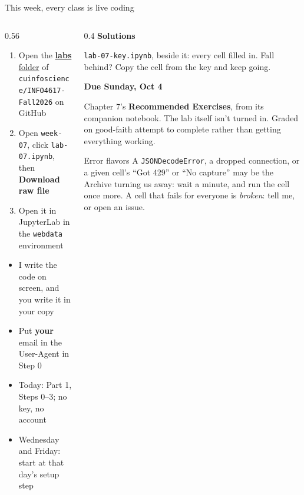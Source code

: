 \documentclass[9pt,aspectratio=169]{beamer}
\begin{document}
\begin{frame}{This week, every class is live coding}
    \begin{columns}[T]
        \begin{column}{0.56\textwidth}
            \begin{enumerate}\small
                \item Open the \href{https://github.com/cuinfoscience/INFO4617-Fall2026/tree/main/labs}{\textbf{labs} folder} of \texttt{cuinfoscience/INFO4617-Fall2026} on GitHub
                \item Open \texttt{week-07}, click \texttt{lab-07.ipynb}, then \textbf{Download raw file}
                \item Open it in JupyterLab in the \texttt{webdata} environment
            \end{enumerate}

            \medskip
            \begin{itemize}\small
                \item I write the code on screen, and you write it in your copy
                \item Put \textbf{your} email in the User-Agent in Step 0
                \item Today: Part 1, Steps 0--3; no key, no account
                \item Wednesday and Friday: start at that day's setup step
            \end{itemize}
        \end{column}
        \begin{column}{0.4\textwidth}
            \textbf{Solutions}\\[2pt]
            {\footnotesize \texttt{lab-07-key.ipynb}, beside it: every cell filled in. Fall behind? Copy the cell from the key and keep going.\par}
            \medskip
            \textbf{Due Sunday, Oct 4}\\[2pt]
            {\footnotesize Chapter 7's \textbf{Recommended Exercises}, from its companion notebook. The lab itself isn't turned in. Graded on good-faith attempt to complete rather than getting everything working.\par}
            \medskip
            \begin{alertblock}{Error flavors}
                \footnotesize A \texttt{JSONDecodeError}, a dropped connection, or a given cell's ``Got 429'' or ``No capture'' may be the Archive turning us away: wait a minute, and run the cell once more. A cell that fails for everyone is \textit{broken}: tell me, or open an issue.
            \end{alertblock}
        \end{column}
    \end{columns}
\end{frame}
\end{document}
